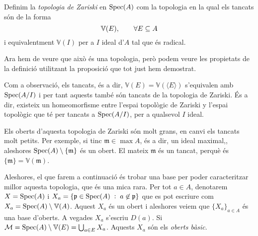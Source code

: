 \documentclass[../../../main.tex]{subfiles}
\begin{document}
\begin{defi}
\label{def:topologiazariski} Definim la \textit{topologia de Zariski} en $\mathrm{Spec}(A)$ com la topologia en la qual els tancats són de la forma
\begin{equation}
    \notag
    \mathbb{V}(E),\qquad \forall E\subseteq A
\end{equation}
i equivalentment $\mathbb{V}(I)$ per a $I$ ideal d'$A$ tal que és radical.
\end{defi}

Ara hem de veure que això és una topologia, però podem veure les propietats de la definició utilitzant la proposició que tot just hem demostrat.

Com a observació, els tancats, és a dir, $\mathbb{V}(E) = \mathbb{V}(\langle E\rangle)$ s'equivalen amb $\mathrm{Spec}(A/I)$ i per tant aquests també són tancats de la topologia de Zariski. És a dir, existeix un homeomorfisme entre l'espai topològic de Zariski y l'espai topològic que té per tancats a $\mathrm{Spec}(A/I)$, per a qualsevol $I$ ideal.

Els oberts d'aquesta topologia de Zariski són molt grans, en canvi els tancats molt petits. Per exemple, si tinc $\mathfrak{m}\in\max A$, és a dir, un ideal maximal,, aleshores $\mathrm{Spec}(A)\setminus\{\mathfrak{m}\}$ és un obert. El mateix $\mathfrak{m}$ és un tancat, perquè és $\{\mathfrak{m}\} = \mathbb{V}(\mathfrak{m})$.

Aleshores, el que farem a continuació és trobar una base per poder caracteritzar millor aquesta topologia, que és una mica rara. Per tot $a\in A$, denotarem $X = \mathrm{Spec}(A)$ i $X_a = \{\mathfrak{p}\in\mathrm{Spec}(A)\;:\;a\not\in\mathfrak{p}\}$ que es pot escriure com $X_a = \mathrm{Spec}(A)\setminus\mathbb{V}(A)$. Aquest $X_a$ és un obert i aleshores veiem que $\{X_a\}_{a\in A}$ és una base d'oberts. A vegades $X_a$ s'escriu $D(a)$. Si $\mathcal{M} = \mathrm{Spec}(A)\setminus\mathbb{V}(E) = \bigcup_{a\in E}X_a$. Aquests $X_a$ són els \textit{oberts bàsic}.
\end{document}
